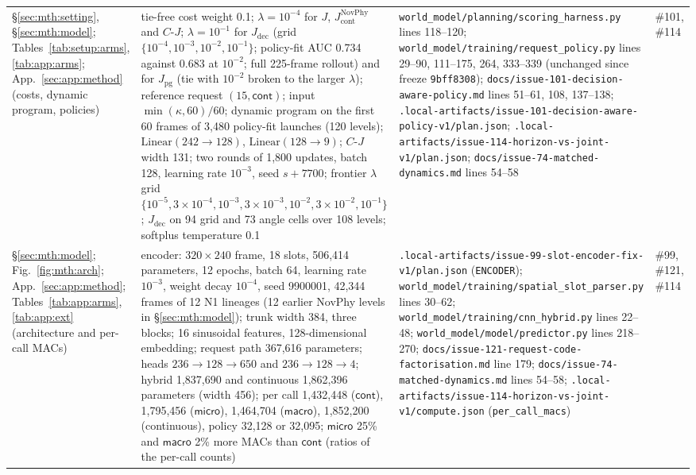 {\begin{revblock}
\begin{longtable}{@{}>{\raggedright\arraybackslash}p{}>{\raggedright\arraybackslash}p{}>{\raggedright\arraybackslash}p{}>{\raggedright\arraybackslash}p{}@{}}
\S\ref{sec:mth:setting}, \S\ref{sec:mth:model}; Tables~\ref{tab:setup:arms}, \ref{tab:app:arms}; App.~\ref{sec:app:method} (costs, dynamic program, policies) & tie-free cost weight 0.1; $\lambda=10^{-4}$ for $J$, $J_{\mathrm{cont}}^{\mathrm{NovPhy}}$ and $C\text{-}J$; $\lambda=10^{-1}$ for $J_{\mathrm{dec}}$ (grid $\{10^{-4},\allowbreak 10^{-3},\allowbreak 10^{-2},\allowbreak 10^{-1}\}$; policy-fit AUC 0.734 against 0.683 at $10^{-2}$; full 225-frame rollout) and for $J_{\mathrm{pg}}$ (tie with $10^{-2}$ broken to the larger $\lambda$); reference request $(15,\textsf{cont})$; input $\min(\kappa,60)/60$; dynamic program on the first 60 frames of 3,480 policy-fit launches (120 levels); $\mathrm{Linear}(242\to128)$, $\mathrm{Linear}(128\to9)$; $C\text{-}J$ width 131; two rounds of 1,800 updates, batch 128, learning rate $10^{-3}$, seed $s+7700$; frontier $\lambda$ grid $\{10^{-5},\allowbreak 3\times10^{-4},\allowbreak 10^{-3},\allowbreak 3\times10^{-3},\allowbreak 10^{-2},\allowbreak 3\times10^{-2},\allowbreak 10^{-1}\}$; $J_{\mathrm{dec}}$ on 94 grid and 73 angle cells over 108 levels; softplus temperature 0.1 & \nolinkurl{world_model/planning/scoring_harness.py} lines 118--120; \nolinkurl{world_model/training/request_policy.py} lines 29--90, 111--175, 264, 333--339 (unchanged since freeze \texttt{9bff8308}); \nolinkurl{docs/issue-101-decision-aware-policy.md} lines 51--61, 108, 137--138; \nolinkurl{.local-artifacts/issue-101-decision-aware-policy-v1/plan.json}; \nolinkurl{.local-artifacts/issue-114-horizon-vs-joint-v1/plan.json}; \nolinkurl{docs/issue-74-matched-dynamics.md} lines 54--58 & \#101, \#114 \\
\S\ref{sec:mth:model}; Fig.~\ref{fig:mth:arch}; App.~\ref{sec:app:method}; Tables~\ref{tab:app:arms}, \ref{tab:app:ext} (architecture and per-call MACs) & encoder: $320\times240$ frame, 18 slots, 506,414 parameters, 12 epochs, batch 64, learning rate $10^{-3}$, weight decay $10^{-4}$, seed 9900001, 42,344 frames of 12 N1 lineages (12 earlier NovPhy levels in \S\ref{sec:mth:model}); trunk width 384, three blocks; 16 sinusoidal features, 128-dimensional embedding; request path 367,616 parameters; heads $236\to128\to650$ and $236\to128\to4$; hybrid 1,837,690 and continuous 1,862,396 parameters (width 456); per call 1,432,448 ($\textsf{cont}$), 1,795,456 ($\textsf{micro}$), 1,464,704 ($\textsf{macro}$), 1,852,200 (continuous), policy 32,128 or 32,095; $\textsf{micro}$ 25\% and $\textsf{macro}$ 2\% more MACs than $\textsf{cont}$ (ratios of the per-call counts) & \nolinkurl{.local-artifacts/issue-99-slot-encoder-fix-v1/plan.json} (\nolinkurl{ENCODER}); \nolinkurl{world_model/training/spatial_slot_parser.py} lines 30--62; \nolinkurl{world_model/training/cnn_hybrid.py} lines 22--48; \nolinkurl{world_model/model/predictor.py} lines 218--270; \nolinkurl{docs/issue-121-request-code-factorisation.md} line 179; \nolinkurl{docs/issue-74-matched-dynamics.md} lines 54--58; \nolinkurl{.local-artifacts/issue-114-horizon-vs-joint-v1/compute.json} (\nolinkurl{per_call_macs}) & \#99, \#121, \#114 \\

\end{longtable}
\end{revblock}}
